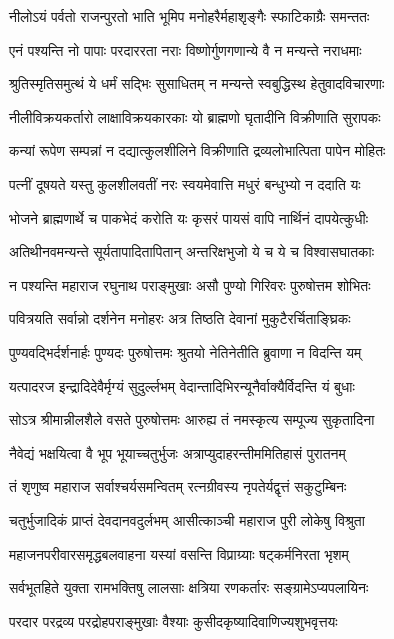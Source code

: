 \twolineshloka
{नीलोऽयं पर्वतो राजन्पुरतो भाति भूमिप}
{मनोहरैर्महाशृङ्गैः स्फाटिकाग्रैः समन्ततः}%

\twolineshloka
{एनं पश्यन्ति नो पापाः परदाररता नराः}
{विष्णोर्गुणगणान्ये वै न मन्यन्ते नराधमाः}%

\twolineshloka
{श्रुतिस्मृतिसमुत्थं ये धर्मं सद्भिः सुसाधितम्}
{न मन्यन्ते स्वबुद्धिस्थ हेतुवादविचारणाः}%

\twolineshloka
{नीलीविक्रयकर्तारो लाक्षाविक्रयकारकाः}
{यो ब्राह्मणो घृतादीनि विक्रीणाति सुरापकः}%

\twolineshloka
{कन्यां रूपेण सम्पन्नां न दद्यात्कुलशीलिने}
{विक्रीणाति द्रव्यलोभात्पिता पापेन मोहितः}%

\twolineshloka
{पत्नीं दूषयते यस्तु कुलशीलवतीं नरः}
{स्वयमेवात्ति मधुरं बन्धुभ्यो न ददाति यः}%

\twolineshloka
{भोजने ब्राह्मणार्थे च पाकभेदं करोति यः}
{कृसरं पायसं वापि नार्थिनं दापयेत्कुधीः}%

\twolineshloka
{अतिथीनवमन्यन्ते सूर्यतापादितापितान्}
{अन्तरिक्षभुजो ये च ये च विश्वासघातकाः}%

\twolineshloka
{न पश्यन्ति महाराज रघुनाथ पराङ्मुखाः}
{असौ पुण्यो गिरिवरः पुरुषोत्तम शोभितः}%

\twolineshloka
{पवित्रयति सर्वान्नो दर्शनेन मनोहरः}
{अत्र तिष्ठति देवानां मुकुटैरर्चिताङ्घ्रिकः}%

\twolineshloka
{पुण्यवद्भिर्दर्शनार्हः पुण्यदः पुरुषोत्तमः}
{श्रुतयो नेतिनेतीति ब्रुवाणा न विदन्ति यम्}%

\twolineshloka
{यत्पादरज इन्द्रादिदेवैर्मृग्यं सुदुर्ल्लभम्}
{वेदान्तादिभिरन्यूनैर्वाक्यैर्विदन्ति यं बुधाः}%

\twolineshloka
{सोऽत्र श्रीमान्नीलशैले वसते पुरुषोत्तमः}
{आरुह्य तं नमस्कृत्य सम्पूज्य सुकृतादिना}%

\twolineshloka
{नैवेद्यं भक्षयित्वा वै भूप भूयाच्चतुर्भुजः}
{अत्राप्युदाहरन्तीममितिहासं पुरातनम्}%

\twolineshloka
{तं शृणुष्व महाराज सर्वाश्चर्यसमन्वितम्}
{रत्नग्रीवस्य नृपतेर्यद्वृत्तं सकुटुम्बिनः}%

\twolineshloka
{चतुर्भुजादिकं प्राप्तं देवदानवदुर्लभम्}
{आसीत्काञ्ची महाराज पुरी लोकेषु विश्रुता}%

\twolineshloka
{महाजनपरीवारसमृद्धबलवाहना}
{यस्यां वसन्ति विप्राग्र्याः षट्कर्मनिरता भृशम्}%

\twolineshloka
{सर्वभूतहिते युक्ता रामभक्तिषु लालसाः}
{क्षत्रिया रणकर्तारः सङ्ग्रामेऽप्यपलायिनः}%

\twolineshloka
{परदार परद्रव्य परद्रोहपराङ्मुखाः}
{वैश्याः कुसीदकृष्यादिवाणिज्यशुभवृत्तयः}%

